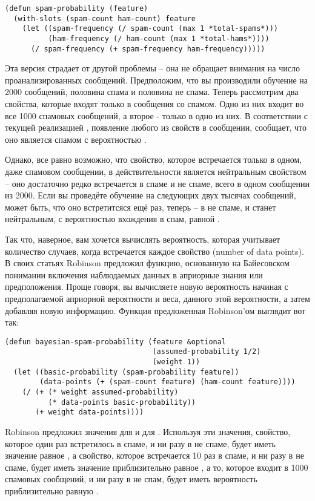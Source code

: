 \begin{lstlisting}
(defun spam-probability (feature)
  (with-slots (spam-count ham-count) feature
    (let ((spam-frequency (/ spam-count (max 1 *total-spams*)))
          (ham-frequency (/ ham-count (max 1 *total-hams*))))
      (/ spam-frequency (+ spam-frequency ham-frequency)))))
\end{lstlisting}

Эта версия страдает от другой проблемы -- она не обращает внимания на число
проанализированных сообщений.  Предположим, что вы производили обучение на 2000 сообщений,
половина спама и половина не спама.  Теперь рассмотрим два свойства, которые входят только
в сообщения со спамом.  Одно из них входит во все 1000 спамовых сообщений, а второе -
только в одно из них.  В соответствии с текущей реализацией ,
появление любого из свойств в сообщении, сообщает, что оно является спамом с вероятностью
.

Однако, все равно возможно, что свойство, которое встречается только в одном, даже
спамовом сообщении, в действительности является нейтральным свойством -- оно достаточно
редко встречается в спаме и не спаме, всего в одном сообщении из 2000.  Если вы проведёте
обучение на следующих двух тысячах сообщений, может быть, что оно встретитсяся ещё раз,
теперь -- в не спаме, и станет нейтральным, с вероятностью вхождения в спам, равной
.

Так что, наверное, вам хочется вычислять вероятность, которая учитывает количество
случаев, когда встречается каждое свойство (number of data points).  В своих статьях
Robinson предложил функцию, основанную на Байесовском понимании включения наблюдаемых
данных в априорные знания или предположения. Проще говоря, вы вычисляете новую вероятность
начиная с предполагаемой априорной вероятности и веса, данного этой вероятности, а затем
добавляя новую информацию. Функция предложенная Robinson'ом выглядит вот так:

\begin{lstlisting}
(defun bayesian-spam-probability (feature &optional
                                  (assumed-probability 1/2)
                                  (weight 1))
  (let ((basic-probability (spam-probability feature))
        (data-points (+ (spam-count feature) (ham-count feature))))
    (/ (+ (* weight assumed-probability)
          (* data-points basic-probability))
       (+ weight data-points))))
\end{lstlisting}

Robinson предложил значения  для  и  для
.  Используя эти значения, свойство, которое один раз встретилось в спаме, и
ни разу в не спаме, будет иметь значение  равное
, а свойство, которое встречается 10 раз в спаме, и ни разу в не спаме, будет
иметь значение  приблизительно равное , а то,
которое входит в 1000 спамовых сообщений, и ни разу в не спам, будет иметь вероятность
приблизительно равную .


